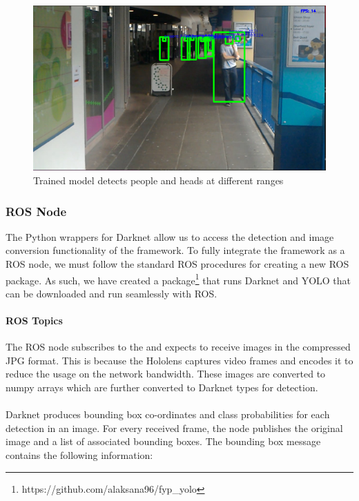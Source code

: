 \begin{figure}[ht]
	\centering
	\includegraphics[width=0.8\linewidth]{img/chapter5_implementation/yoloWalkway.png}
	\caption{Trained model detects people and heads at different ranges}
	\label{fig:yoloRange}
\end{figure}

\subsubsection{ROS Node} \label{sec:nodeYOLO}
The Python wrappers for Darknet allow us to access the detection and image conversion functionality of the framework. To fully integrate the framework as a ROS node, we must follow the standard ROS procedures for creating a new ROS package. As such, we have created a package\footnote{https://github.com/alaksana96/fyp\_yolo} that runs Darknet and YOLO that can be downloaded and run seamlessly with ROS.

\paragraph{ROS Topics} The ROS node subscribes to the  and expects to receive images in the compressed JPG format. This is because the Hololens captures video frames and encodes it to reduce the usage on the network bandwidth. These images are converted to numpy arrays which are further converted to Darknet  types for detection. 

\paragraph{} Darknet produces bounding box co-ordinates and class probabilities for each detection in an image. For every received frame, the node publishes the original image and a list of associated bounding boxes. The bounding box message contains the following information: \\

